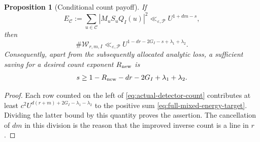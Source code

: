 \documentclass[11pt]{article}
\newtheorem{proposition}[theorem]{Proposition}
\theoremstyle{definition}
\newcommand{\eps}{\varepsilon}
\newcommand{\lls}{\ll_{\eps,\mathcal P}}
\begin{document}
\begin{proposition}[Conditional count payoff]
\label{prop:actual-detector-payoff}
If
\begin{equation}
 E_{\mathcal C}:=\sum_{u\in\mathcal C}|M_uS_uQ_I(u)|^2
       \lls U^{1+dm-s},
 \label{eq:full-mixed-energy-target}
\end{equation}
then
\begin{equation}
 \#\mathcal W_{r,m,I}
 \lls U^{1-dr-2G_I-s+\lambda_1+\lambda_2}.
 \label{eq:actual-detector-count}
\end{equation}
Consequently, apart from the subsequently allocated analytic loss, a
sufficient saving for a desired count exponent \(R_{\rm new}\) is
\begin{equation}
 s\ge 1-R_{\rm new}-dr-2G_I+\lambda_1+\lambda_2.
 \label{eq:actual-required-saving}
\end{equation}
\end{proposition}
\begin{proof}
Each row counted on the left of \eqref{eq:actual-detector-count}
contributes at least
\(c^2U^{d(r+m)+2G_I-\lambda_1-\lambda_2}\) to the positive sum
\eqref{eq:full-mixed-energy-target}.  Dividing the latter bound by this
quantity proves the assertion.  The cancellation of \(dm\) in this division
is the reason that the improved inverse count is a line in \(r\).
\end{proof}
\end{document}
